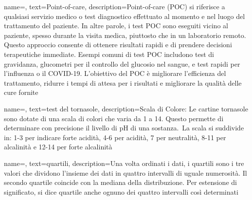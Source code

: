  {
    name=,
    text=Point-of-care,
    description={Point-of-care (POC) si riferisce a qualsiasi servizio medico o test diagnostico effettuato al momento e nel luogo del trattamento del paziente. In altre parole, i test POC sono eseguiti vicino al paziente, spesso durante la visita medica, piuttosto che in un laboratorio remoto. Questo approccio consente di ottenere risultati rapidi e di prendere decisioni terapeutiche immediate. Esempi comuni di test POC includono test di gravidanza, glucometri per il controllo del glucosio nel sangue, e test rapidi per l'influenza o il COVID-19. L'obiettivo del POC è migliorare l'efficienza del trattamento, ridurre i tempi di attesa per i risultati e migliorare la qualità delle cure fornite}
}

 {
    name=,
    text=test del tornasole,
    description={Scala di Colore: Le cartine tornasole sono dotate di una scala di colori che varia da 1 a 14. Questo permette di determinare con precisione il livello di pH di una sostanza. La scala si suddivide in: 1-3
    per indicare forte acidità, 4-6 per acidità, 7 per neutralità, 8-11 per alcalinità e 12-14 per forte
    alcalinità}
}

 {
    name=,
    text=quartili,
    description={Una volta ordinati i dati, i quartili sono i tre valori che dividono l'insieme dei dati in quattro intervalli di uguale numerosità. Il secondo quartile coincide con la mediana della distribuzione. Per estensione di significato, si dice quartile anche ognuno dei quattro intervalli così determinati}
}